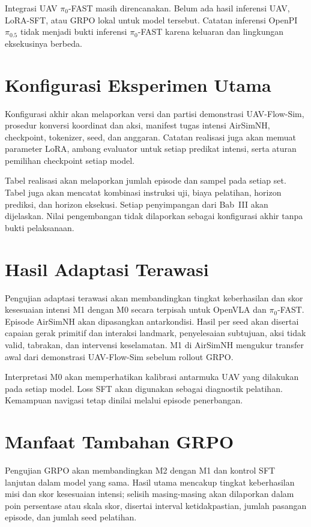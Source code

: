 Integrasi UAV $\pi_0$-FAST masih direncanakan. Belum ada hasil inferensi UAV, LoRA-SFT, atau GRPO lokal untuk model tersebut. Catatan inferensi OpenPI $\pi_{0.5}$ tidak menjadi bukti inferensi $\pi_0$-FAST karena keluaran dan lingkungan eksekusinya berbeda.

\section{Konfigurasi Eksperimen Utama}
\label{sec:konfigurasi_utama}
Konfigurasi akhir akan melaporkan versi dan partisi demonstrasi UAV-Flow-Sim, prosedur konversi koordinat dan aksi, manifest tugas intensi AirSimNH, checkpoint, tokenizer, seed, dan anggaran. Catatan realisasi juga akan memuat parameter LoRA, ambang evaluator untuk setiap predikat intensi, serta aturan pemilihan checkpoint setiap model.

Tabel realisasi akan melaporkan jumlah episode dan sampel pada setiap set. Tabel juga akan mencatat kombinasi instruksi uji, biaya pelatihan, horizon prediksi, dan horizon eksekusi. Setiap penyimpangan dari Bab~III akan dijelaskan. Nilai pengembangan tidak dilaporkan sebagai konfigurasi akhir tanpa bukti pelaksanaan.

\section{Hasil Adaptasi Terawasi}
\label{sec:hasil_sft}
Pengujian adaptasi terawasi akan membandingkan tingkat keberhasilan dan skor kesesuaian intensi M1 dengan M0 secara terpisah untuk OpenVLA dan $\pi_0$-FAST. Episode AirSimNH akan dipasangkan antarkondisi. Hasil per seed akan disertai capaian gerak primitif dan interaksi landmark, penyelesaian subtujuan, aksi tidak valid, tabrakan, dan intervensi keselamatan. M1 di AirSimNH mengukur transfer awal dari demonstrasi UAV-Flow-Sim sebelum rollout GRPO.

Interpretasi M0 akan memperhatikan kalibrasi antarmuka UAV yang dilakukan pada setiap model. Loss SFT akan digunakan sebagai diagnostik pelatihan. Kemampuan navigasi tetap dinilai melalui episode penerbangan.

\section{Manfaat Tambahan GRPO}
\label{sec:hasil_grpo}
Pengujian GRPO akan membandingkan M2 dengan M1 dan kontrol SFT lanjutan dalam model yang sama. Hasil utama mencakup tingkat keberhasilan misi dan skor kesesuaian intensi; selisih masing-masing akan dilaporkan dalam poin persentase atau skala skor, disertai interval ketidakpastian, jumlah pasangan episode, dan jumlah seed pelatihan.

